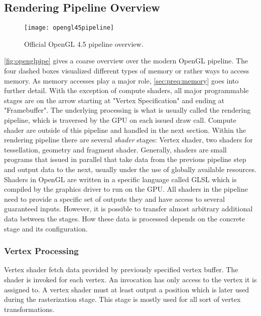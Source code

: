 \documentclass[thesis.tex]{subfiles}
\begin{document}
\subsection{Rendering Pipeline Overview}
\begin{figure}[h]
\centering
\texttt{[image: opengl45pipeline]}
\caption{\cite{bib:openglspec} Official OpenGL 4.5 pipeline overview.}
\label{fig:openglpipe}
\end{figure}
\autoref{fig:openglpipe} gives a coarse overview over the modern OpenGL pipeline.
The four dashed boxes visualized different types of memory or rather ways to access memory.
As memory accesses play a major role, \autoref{sec:preq:memory} goes into further detail.
With the exception of compute shaders, all major programmable stages are on the arrow starting at "Vertex Specification" and ending at "Framebuffer".
The underlying processing is what is usually called the rendering pipeline, which is traversed by the GPU on each issued draw call.
Compute shader are outside of this pipeline and handled in the next section.
Within the rendering pipeline there are several \emph{shader} stages: Vertex shader, two shaders for tessellation, geometry and fragment shader.
Generally, shaders are small programs that issued in parallel that take data from the previous pipeline step and output data to the next, usually under the use of globally available resources.
Shaders in OpenGL are written in a specific language called GLSL which is compiled by the graphics driver to run on the GPU.
All shaders in the pipeline need to provide a specific set of outputs they and have access to several guaranteed inputs.
However, it is possible to transfer almost arbitrary additional data between the stages.
How these data is processed depends on the concrete stage and its configuration.

\subsubsection{Vertex Processing}
Vertex shader fetch data provided by previously specified vertex buffer.
The shader is invoked for each vertex.
An invocation has only access to the vertex it is assigned to.
A vertex shader must at least output a position which is later used during the rasterization stage.
This stage is mostly used for all sort of vertex transformations.
\end{document}
